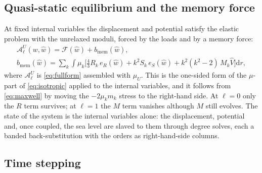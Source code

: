 \documentclass[11pt,a4paper]{article}
\newcommand{\dd}{\mathrm{d}}
\newcommand{\Ad}{\mathcal{A}_{\ell}}
\numberwithin{equation}{section}
\begin{document}
\subsection{Quasi-static equilibrium and the memory force}

At fixed internal variables the displacement and potential satisfy the elastic
problem with the unrelaxed moduli, forced by the loads and by a memory force:
\begin{gather}
\Ad^{U}(w,\hat w) = \mathcal{F}(\hat w) + b_{\mathrm{mem}}(\hat w),\\
b_{\mathrm{mem}}(\hat w) = \sum_{k}\int\mu_{k}\Big[\tfrac43 R_{k}\,e_{R}(\hat w)
 + k^{2}S_{k}\,e_{S}(\hat w) + k^{2}(k^{2}-2)\,M_{k}\hat V\Big]\dd r,
\end{gather}
where $\Ad^{U}$ is \eqref{eq:fullform} assembled with $\mu_{U}$. This is
the one-sided form of the $\mu$-part of \eqref{eq:isotropic} applied to the
internal variables, and it follows from \eqref{eq:maxwell} by moving the
$-2\mu_{k}m_{k}$ stress to the right-hand side. At $\ell=0$ only the $R$ term
survives; at $\ell=1$ the $M$ term vanishes although $M$ still evolves. The
state of the system is the internal variables alone: the displacement,
potential and, once coupled, the sea level are slaved to them through degree
solves, each a banded back-substitution with the orders as right-hand-side
columns.

\subsection{Time stepping}
\end{document}
